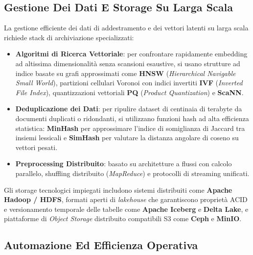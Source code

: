 \documentclass[11pt, a4paper]{article}
\begin{document}

\subsection{Gestione Dei Dati E Storage Su Larga Scala}

La gestione efficiente dei dati di addestramento e dei vettori latenti su larga scala richiede stack di archiviazione specializzati:
\begin{itemize}
    \item \textbf{Algoritmi di Ricerca Vettoriale}: per confrontare rapidamente embedding ad altissima dimensionalità senza scansioni esaustive, si usano strutture ad indice basate su grafi approssimati come \textbf{HNSW} (\emph{Hierarchical Navigable Small World}), partizioni cellulari Voronoi con indici invertiti \textbf{IVF} (\emph{Inverted File Index}), quantizzazioni vettoriali \textbf{PQ} (\emph{Product Quantization}) e \textbf{ScaNN}.
    \item \textbf{Deduplicazione dei Dati}: per ripulire dataset di centinaia di terabyte da documenti duplicati o ridondanti, si utilizzano funzioni hash ad alta efficienza statistica: \textbf{MinHash} per approssimare l'indice di somiglianza di Jaccard tra insiemi lessicali e \textbf{SimHash} per valutare la distanza angolare di coseno su vettori pesati.
    \item \textbf{Preprocessing Distribuito}: basato su architetture a flussi con calcolo parallelo, shuffling distribuito (\emph{MapReduce}) e protocolli di streaming unificati.
\end{itemize}

Gli storage tecnologici impiegati includono sistemi distribuiti come \textbf{Apache Hadoop / HDFS}, formati aperti di \emph{lakehouse} che garantiscono proprietà ACID e versionamento temporale delle tabelle come \textbf{Apache Iceberg} e \textbf{Delta Lake}, e piattaforme di \emph{Object Storage} distribuito compatibili S3 come \textbf{Ceph} e \textbf{MinIO}.


\subsection{Automazione Ed Efficienza Operativa}
\end{document}
